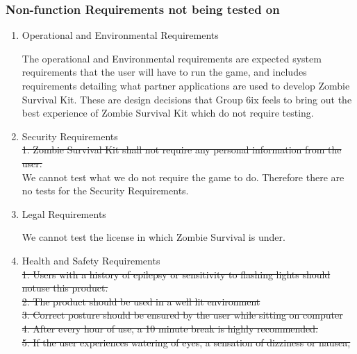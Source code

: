 \documentclass[12pt, titlepage]{article}
\begin{document}
\subsubsection{Non-function Requirements not being tested on}

\begin{enumerate}

	\item{{\color{magenta} Operational and Environmental Requirements}\\}
	
	{\color{magenta} The operational and Environmental requirements are expected system requirements that the user will have to run the game, and includes requirements detailing what partner applications are used to develop Zombie Survival Kit. These are design decisions that Group 6ix feels to bring out the best experience of Zombie Survival Kit which do not require testing.}
	
	\item{Security Requirements\\}
	\sout{1. Zombie Survival Kit shall not require any personal information from the user.}\\ 

	We cannot test what we do not require the game to do. Therefore there are no tests for the Security Requirements.

	\item{Legal Requirements\\}

	We cannot test the license in which Zombie Survival is under.
	
	\item{Health and Safety Requirements\\}
	\sout{1. Users with a history of epilepsy or sensitivity to flashing lights should notuse this product.}\\
	
	\sout{2. The product should be used in a well lit environment}\\
	
	\sout{3. Correct posture should be ensured by the user while sitting on computer}\\
	
	\sout{4. After every hour of use, a 10 minute break is highly recommended.}\\
	
	\sout{5. If the user experiences watering of eyes, a sensation of dizziness or nausea,}\\
	

\end{enumerate}
\end{document}
